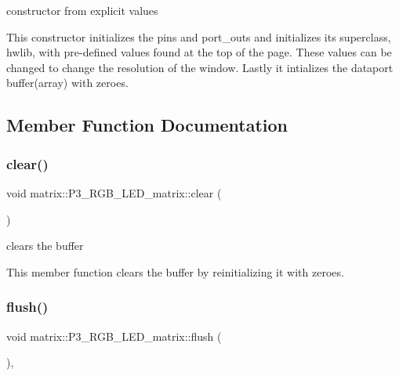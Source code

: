 constructor from explicit values 

This constructor initializes the pins and port\+\_\+outs and initializes its superclass, hwlib, with pre-\/defined values found at the top of the page. These values can be changed to change the resolution of the window. Lastly it intializes the dataport buffer(array) with zeroes. 

\subsection{Member Function Documentation}
\mbox{\label{classmatrix_1_1P3__RGB__LED__matrix_ad620281eed116f01cab6cadd01156b12}} 
\subsubsection{\texorpdfstring{clear()}{clear()}}
{\footnotesize\ttfamily void matrix\+::\+P3\+\_\+\+R\+G\+B\+\_\+\+L\+E\+D\+\_\+matrix\+::clear (\begin{DoxyParamCaption}{ }\end{DoxyParamCaption})\hspace{0.3cm}{\ttfamily [inline]}}



clears the buffer 

This member function clears the buffer by reinitializing it with zeroes. \mbox{\label{classmatrix_1_1P3__RGB__LED__matrix_a50d11c7dfc0ba8d528c59be288377b8a}} 
\subsubsection{\texorpdfstring{flush()}{flush()}}
{\footnotesize\ttfamily void matrix\+::\+P3\+\_\+\+R\+G\+B\+\_\+\+L\+E\+D\+\_\+matrix\+::flush (\begin{DoxyParamCaption}{ }\end{DoxyParamCaption})\hspace{0.3cm}{\ttfamily [inline]}, {\ttfamily [override]}}



